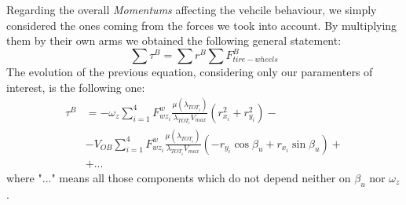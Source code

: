 	Regarding the overall \textit{Momentums} affecting the vehcile behaviour, we simply considered the ones coming from the forces we took into account. By multiplying them by their own arms we obtained the following general statement:
		\begin{equation}
			\sum \tau^{B} = \sum r^{B} \sum F_{tire-wheels}^{B}
		\end{equation}
	The evolution of the previous equation, considering only our paramenters of interest, is the following one:  
		\begin{equation}
			\begin{split}
				\tau^{B} &= -\omega_{z}\sum_{i=1}^{4} F_{wz_{i}}^{w} \frac{\mu(\lambda_{TOT_{i}})}{\lambda_{TOT_{i}} V_{max}} (r_{x_{i}}^{2} + r_{y_{i}}^{2})- \\ &- V_{OB}\sum_{i=1}^{4} F_{wz_{i}}^{w} \frac{\mu(\lambda_{TOT_{i}})}{\lambda_{TOT_{i}} V_{max}} (- r_{y_{i}} \cos \beta_{u} + r_{x_{i}} \sin\beta_{u})+ \\ &+ ... 
			\end{split}	
		\end{equation}
	where "$ ... $" means all those components which do not depend neither on $\beta_{u}$ nor $\omega_{z}$.
